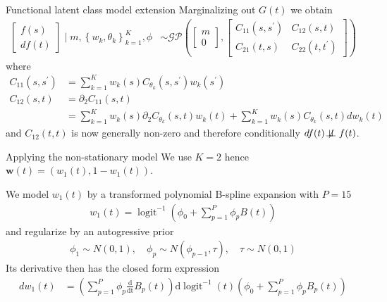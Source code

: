 \documentclass[ignorenonframetext,xcolor=pdflatex,table,dvipsnames,serif]{beamer}
\DeclareMathOperator{\logit}{logit}
\begin{document}
\begin{frame}{Functional latent class model extension}
Marginalizing out $G(t)$ we obtain
\begin{align*}
  \begin{bmatrix}f(s)\\ df(t) \end{bmatrix} \mid m, \left\{w_k, \theta_k\right\}_{k=1}^K, \phi &\sim \mathcal{GP}\left(\begin{bmatrix}m\\ 0\end{bmatrix}, \begin{bmatrix}C_{11}(s, s^\prime) & C_{12}(s, t)\\ C_{21}(t, s) & C_{22}(t, t^\prime)\end{bmatrix}\right)
\end{align*}
where
\begin{align*}
  C_{11}(s, s^\prime) &= \sum_{k=1}^K w_k(s)C_{\theta_k}(s,s^\prime)w_k(s^\prime)\\
  C_{12}(s, t) &= \partial_2 C_{11}(s, t)\\
               &= \sum_{k=1}^K w_k(s) \partial_2 C_{\theta_k}(s,t)w_k(t) + \sum_{k=1}^K w_k(s)C_{\theta_k}(s,t)dw_k(t)
\end{align*}
and $C_{12}(t,t)$ is now generally non-zero and therefore conditionally $df(t) \not\!\perp\!\!\!\perp f(t)$.
\end{frame}

\begin{frame}{Applying the non-stationary model}
We use $K = 2$ hence $\mathbf{w}(t) = (w_1(t), 1 - w_1(t))$.
  
We model $w_1(t)$ by a transformed polynomial B-spline expansion with $P = 15$
\begin{align*}
  w_1(t) = \logit^{-1}\left(\phi_0 + \sum_{p=1}^P \phi_p B(t)\right)
\end{align*}
and regularize by an autogressive prior
\begin{align*}
   \phi_1 \sim N(0,1), \quad \phi_{p} \sim N(\phi_{p-1}, \tau), \quad \tau \sim N(0, 1)
\end{align*}
Its derivative then has the closed form expression
\begin{align*}
  dw_1(t) &= \left(\sum_{p=1}^P \phi_p \frac{\mathrm{d}}{\mathrm{dt}}B_p(t)\right) \mathrm{d}\logit^{-1}(t)\left(\phi_0 + \sum_{p=1}^P \phi_p B_p(t)\right)
\end{align*}
\end{frame}
\end{document}
